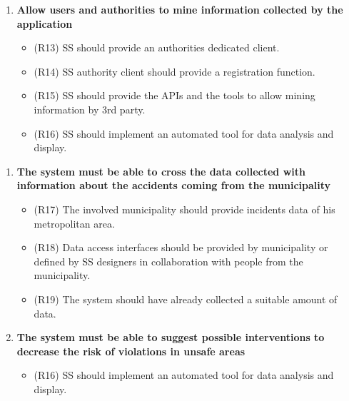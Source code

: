 \begin{enumerate} [label = G\arabic* - ]
\item \textbf{Allow users and authorities to mine information collected by the application}
	\begin{itemize}
	\item (R13) SS should provide an authorities dedicated client.
	\item (R14) SS authority client should provide a registration function.
	\item (R15) SS should provide the APIs and the tools to allow mining information by 3rd party.
	\item (R16) SS should implement an automated tool for data analysis and display.
	\end{itemize}
	\bigskip
	\end{enumerate}
	
\begin{enumerate} [label = GA 1.\arabic* - ]

\item \textbf{The system must be able to cross the data collected with information about the accidents coming from the municipality} 
	\begin{itemize}
	\item (R17) The involved municipality should provide incidents data of his metropolitan area.
	\item (R18) Data access interfaces should be provided by municipality or defined by SS designers in collaboration with people from the municipality.
	\item (R19) The system should have already collected a suitable amount of data.
	\end{itemize}
	\bigskip
	
\item\textbf{The system must be able to suggest possible interventions to decrease the risk of violations in unsafe areas}
	\begin{itemize}
	\item (R16) SS should implement an automated tool for data analysis and display.
	\end{itemize}
	\bigskip
\end{enumerate}

